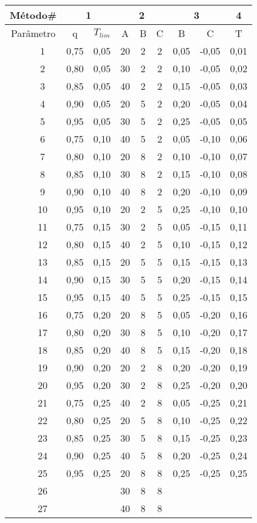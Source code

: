 \begin{table}[htb]
{
	\begin{tabular}{cc|cc|ccc|cc|c}
		\toprule
		\multicolumn{2}{c}{Método\#} & \multicolumn{2}{c}{1} & \multicolumn{3}{c}{2} & \multicolumn{2}{c}{3} & 4\\
		\midrule
		\multicolumn{2}{c}{Parâmetro}	&q&$T_{lim}$&A&B&C&B&C&T \\
		\midrule \midrule					
		\multirow{27}{*}{\rotatebox{90}{Índice da Combinação}} &
		 1 			&0,75&0,05			&20 & 2 & 2			&0,05&-0,05			&0,01\\
		&2 			&0,80&0,05			&30 & 2 & 2			&0,10&-0,05			&0,02\\
		&3 			&0,85&0,05			&40 & 2 & 2			&0,15&-0,05			&0,03\\
		&4 			&0,90&0,05			&20 & 5 & 2			&0,20&-0,05			&0,04\\
		&5 			&0,95&0,05			&30 & 5 & 2			&0,25&-0,05			&0,05\\
		&6 			&0,75&0,10			&40 & 5 & 2			&0,05&-0,10			&0,06\\
		&7 			&0,80&0,10			&20 & 8 & 2			&0,10&-0,10			&0,07\\
		&8 			&0,85&0,10			&30 & 8 & 2			&0,15&-0,10			&0,08\\
		&9 			&0,90&0,10			&40 & 8 & 2			&0,20&-0,10			&0,09\\
		&10			&0,95&0,10			&20 & 2 & 5			&0,25&-0,10			&0,10\\
		&11			&0,75&0,15			&30 & 2 & 5			&0,05&-0,15			&0,11\\
		&12			&0,80&0,15			&40 & 2 & 5			&0,10&-0,15			&0,12\\
		&13			&0,85&0,15			&20 & 5 & 5			&0,15&-0,15			&0,13\\
		&14			&0,90&0,15			&30 & 5 & 5			&0,20&-0,15			&0,14\\
		&15			&0,95&0,15			&40 & 5 & 5			&0,25&-0,15			&0,15\\
		&16			&0,75&0,20			&20 & 8 & 5			&0,05&-0,20			&0,16\\
		&17			&0,80&0,20			&30 & 8 & 5			&0,10&-0,20			&0,17\\
		&18			&0,85&0,20			&40 & 8 & 5			&0,15&-0,20			&0,18\\
		&19			&0,90&0,20			&20 & 2 & 8			&0,20&-0,20			&0,19\\
		&20			&0,95&0,20			&30 & 2 & 8			&0,25&-0,20			&0,20\\
		&21			&0,75&0,25			&40 & 2 & 8			&0,05&-0,25			&0,21\\
		&22			&0,80&0,25			&20 & 5 & 8			&0,10&-0,25			&0,22\\
		&23			&0,85&0,25			&30 & 5 & 8			&0,15&-0,25			&0,23\\
		&24			&0,90&0,25			&40 & 5 & 8			&0,20&-0,25			&0,24\\
		&25			&0,95&0,25			&20 & 8 & 8			&0,25&-0,25			&0,25\\
		&26			&    &    			&30 & 8 & 8			&	 &				&\\
		&27			&    &    			&40 & 8 & 8			&	 &				&\\
		\bottomrule
	\end{tabular}
}{}
\end{table}
